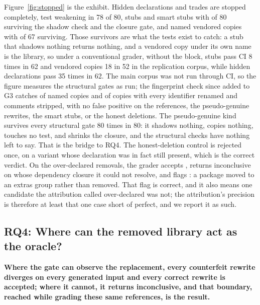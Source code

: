 \documentclass[11pt]{article}
\begin{document}
Figure~\ref{fig:stopped} is the exhibit.
Hidden declarations and trades are stopped completely, test weakening in 78 of 80, stubs and smart stubs with \nStubSurvive{} of 80 surviving the shadow check and the closure gate, and named vendored copies with \nVendorSurvive{} of 67 surviving.
Those survivors are what the tests exist to catch: a stub that shadows nothing returns nothing, and a vendored copy under its own name is the library, so under a conventional grader, without the block, stubs pass CI 8 times in 62 and vendored copies 18 in 52 in the replication corpus, while hidden declarations pass 35 times in 62.
The main corpus was not run through CI, so the figure measures the structural gates as run; the fingerprint check since added to G3 catches \nVendorNamedCaught{} of \nVendorNamed{} named copies and \nVendorRenamedCaught{} of \nVendorRenamed{} copies with every identifier renamed and comments stripped, with no false positive on the references, the pseudo-genuine rewrites, the smart stubs, or the honest deletions.
The pseudo-genuine kind survives every structural gate 80 times in 80: it shadows nothing, copies nothing, touches no test, and shrinks the closure, and the structural checks have nothing left to say.
That is the bridge to RQ4.
The honest-deletion control is rejected once, on a variant whose declaration was in fact still present, which is the correct verdict.
On the \nOverDeclGraded{} over-declared removals, the grader accepts \nFRAccepted, returns inconclusive on \nFRInconclusive{} whose dependency closure it could not resolve, and flags \nFRFlagged: a package moved to an extras group rather than removed.
That flag is correct, and it also means one candidate the attribution called over-declared was not; the attribution's precision is therefore at least that one case short of perfect, and we report it as such.

\subsection{RQ4: Where can the removed library act as the oracle?}
\label{sec:rq4}

\textbf{Where the gate can observe the replacement, every counterfeit rewrite diverges on every generated input and every correct rewrite is accepted; where it cannot, it returns inconclusive, and that boundary, reached while grading these same references, is the result.}
\end{document}
